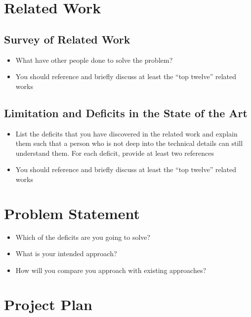 \documentclass[rnd]{mas_proposal}
\begin{document}
\section{Related Work}

\subsection{Survey of Related Work}
\begin{itemize}
    \item What have other people done to solve the problem?
    \item You should reference and briefly discuss at least the ``top twelve'' related works
\end{itemize}

\subsection{Limitation and Deficits in the State of the Art}
\begin{itemize}
    \item List the deficits that you have discovered in the related work and explain them such that a person who is not deep into the technical details can still understand them.
    For each deficit, provide at least two references
    \item You should reference and briefly discuss at least the ``top twelve'' related works
\end{itemize}

\section{Problem Statement}
\begin{itemize}
    \item Which of the deficits are you going to solve?
    \item What is your intended approach?
    \item How will you compare you approach with existing approaches?
\end{itemize}

\section{Project Plan}
\end{document}
